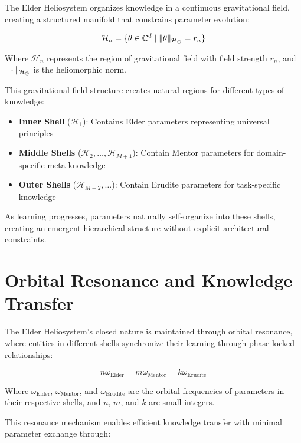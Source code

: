 The Elder Heliosystem organizes knowledge in a continuous gravitational field, creating a structured manifold that constrains parameter evolution:

\begin{equation}
\mathcal{H}_n = \{\theta \in \mathbb{C}^{d} \mid \|\theta\|_{\mathcal{H}_{\odot}} = r_n\}
\end{equation}

Where $\mathcal{H}_n$ represents the region of gravitational field with field strength $r_n$, and $\|\cdot\|_{\mathcal{H}_{\odot}}$ is the heliomorphic norm.

This gravitational field structure creates natural regions for different types of knowledge:

\begin{itemize}
    \item \textbf{Inner Shell} ($\mathcal{H}_1$): Contains Elder parameters representing universal principles
    \item \textbf{Middle Shells} ($\mathcal{H}_2, \ldots, \mathcal{H}_{M+1}$): Contain Mentor parameters for domain-specific meta-knowledge
    \item \textbf{Outer Shells} ($\mathcal{H}_{M+2}, \ldots$): Contain Erudite parameters for task-specific knowledge
\end{itemize}

As learning progresses, parameters naturally self-organize into these shells, creating an emergent hierarchical structure without explicit architectural constraints.

\section{Orbital Resonance and Knowledge Transfer}

The Elder Heliosystem's closed nature is maintained through orbital resonance, where entities in different shells synchronize their learning through phase-locked relationships:

\begin{equation}
n\omega_{\text{Elder}} = m\omega_{\text{Mentor}} = k\omega_{\text{Erudite}}
\end{equation}

Where $\omega_{\text{Elder}}$, $\omega_{\text{Mentor}}$, and $\omega_{\text{Erudite}}$ are the orbital frequencies of parameters in their respective shells, and $n$, $m$, and $k$ are small integers.

This resonance mechanism enables efficient knowledge transfer with minimal parameter exchange through:

